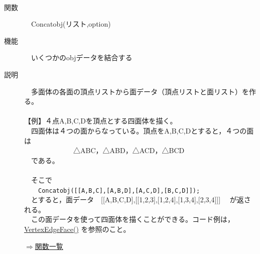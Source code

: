 \documentclass[papersize,a4paper,12pt,uplatex]{jsarticle}
\begin{document}
\begin{description}
\hypertarget{concatobj}{}　　
\item[関数]　Concatobj(リスト,option)
\item[機能]　いくつかのobjデータを結合する
\item[説明]　多面体の各面の頂点リストから面データ（頂点リストと面リスト）を作る。\\
　\\
【例】４点A,B,C,Dを頂点とする四面体を描く。\\
　四面体は４つの面からなっている。頂点をA,B,C,Dとすると，４つの面は\\
　　　　　　　△ABC，△ABD，△ACD，△BCD\\
　である。\\
　　　　\\
　そこで\\
　　\verb|Concatobj([[A,B,C],[A,B,D],[A,C,D],[B,C,D]]);|\\
　とすると，面データ　[[A,B,C,D],[[1,2,3],[1,2,4],[1,3,4],[2,3,4]]] 　が返される。\\
　この面データを使って四面体を描くことができる。コード例は，\hyperlink{vertexedgeface}{VertexEdgeFace()} を参照のこと。

\begin{flushright} \hyperlink{functionlist3d}{$\Rightarrow$関数一覧}\end{flushright}


\end{description}
\end{document}
